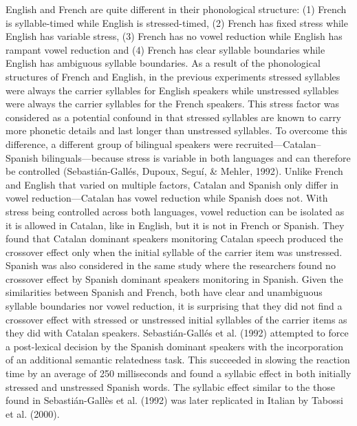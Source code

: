 English and French are quite different in their phonological structure: (1) French is syllable-timed while English is stressed-timed, (2) French has fixed stress while English has variable stress, (3) French has no vowel reduction while English has rampant vowel reduction and (4) French has clear syllable boundaries while English has ambiguous syllable boundaries. As a result of the phonological structures of French and English, in the previous experiments stressed syllables were always the carrier syllables for English speakers while unstressed syllables were always the carrier syllables for the French speakers. This stress factor was considered as a potential confound in that stressed syllables are known to carry more phonetic details and last longer than unstressed syllables. To overcome this difference, a different group of bilingual speakers were recruited—Catalan–Spanish bilinguals—because stress is variable in both languages and can therefore be controlled (Sebastián-Gallés, Dupoux, Seguí, \& Mehler, 1992). Unlike French and English that varied on multiple factors, Catalan and Spanish only differ in vowel reduction—Catalan has vowel reduction while Spanish does not. With stress being controlled across both languages, vowel reduction can be isolated as it is allowed in Catalan, like in English, but it is not in French or Spanish. They found that Catalan dominant speakers monitoring Catalan speech produced the crossover effect only when the initial syllable of the carrier item was unstressed. Spanish was also considered in the same study where the researchers found no crossover effect by Spanish dominant speakers monitoring in Spanish. Given the similarities between Spanish and French, both have clear and unambiguous syllable boundaries nor vowel reduction, it is surprising that they did not find a crossover effect with stressed or unstressed initial syllables of the carrier items as they did with Catalan speakers. Sebastián-Gallés et al. (1992) attempted to force a post-lexical decision by the Spanish dominant speakers with the incorporation of an additional semantic relatedness task. This succeeded in slowing the reaction time by an average of 250 milliseconds and found a syllabic effect in both initially stressed and unstressed Spanish words. The syllabic effect similar to the those found in Sebastián-Gallès et al. (1992) was later replicated in Italian by Tabossi et al. (2000).
